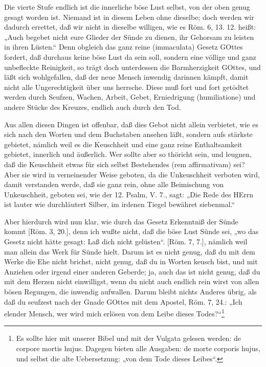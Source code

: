 Die vierte Stufe endlich ist die innerliche böse Lust selbst, von der oben genug gesagt worden ist. Niemand ist in diesem Leben ohne dieselbe; doch werden wir dadurch errettet, daß wir nicht in dieselbe willigen, wie es Röm. 6, 13. 12. heißt: „Auch begebet nicht eure Glieder der Sünde zu dienen, ihr Gehorsam zu leisten in ihren Lüsten.“ Denn obgleich das ganz reine (immaculata) Gesetz GOttes fordert, daß durchaus keine böse Lust da sein soll, sondern eine völlige und ganz unbefleckte
Reinigkeit, so trägt doch unterdessen die Barmherzigkeit GOttes, und läßt sich wohlgefallen, daß der neue Mensch inwendig darinnen kämpft, damit nicht alle Ungerechtigkeit über uns herrsche. Diese muß fort und fort getödtet werden durch Seufzen, Wachen, Arbeit, Gebet, Erniedrigung (humiliatione) und andere Stücke des Kreuzes, endlich auch durch den Tod.

Aus allen diesen Dingen ist offenbar, daß dies Gebot nicht allein verbietet, wie es sich nach den Worten und dem Buchstaben ansehen läßt, sondern aufs stärkste gebietet, nämlich weil es die Keuschheit und eine ganz reine Enthaltsamkeit gebietet, innerlich und äußerlich. Wer sollte aber so thöricht sein, und leugnen, daß die Keuschheit etwas für sich selbst Bestehendes (rem affirmativam) sei? Aber sie wird in verneinender Weise geboten, da die Unkeuschheit verboten wird, damit verstanden werde, daß sie ganz rein, ohne alle Beimischung von Unkeuschheit, geboten sei, wie der 12. Psalm, V. 7., sagt: „Die Rede des HErrn ist lauter wie durchläutert Silber, im irdenen Tiegel bewähret siebenmal.“

Aber hierdurch wird nun klar, wie durch das Gesetz Erkenntniß der Sünde kommt [Röm. 3, 20.], denn ich wußte nicht, daß die böse Lust Sünde sei, „wo das Gesetz nicht hätte gesagt: Laß dich nicht gelüsten“. [Röm. 7, 7.], nämlich weil man allein das Werk für Sünde hielt. Darum ist es nicht genug, daß du mit dem Werke die Ehe nicht brichst, nicht genug, daß du in Worten keusch bist, und mit Anziehen oder irgend einer anderen Geberde; ja, auch das ist nicht genug, daß du mit dem Herzen nicht einwilligst, wenn du nicht auch endlich rein wirst von allen bösen Regungen, die inwendig aufwallen. Darum bleibt nichts Anderes übrig, als daß du seufzest nach der Gnade GOttes mit dem Apostel, Röm. 7, 24.: „Ich elender Mensch, wer wird mich erlösen von dem Leibe dieses Todes?“\footnote{Es sollte hier mit unserer Bibel und mit der Vulgata gelesen werden: de corpore mortis hujus. Dagegen bieten alle Ausgaben: de morte corporis hujus, und selbst die alte Uebersetzung: „von dem Tode dieses Leibes“.}

